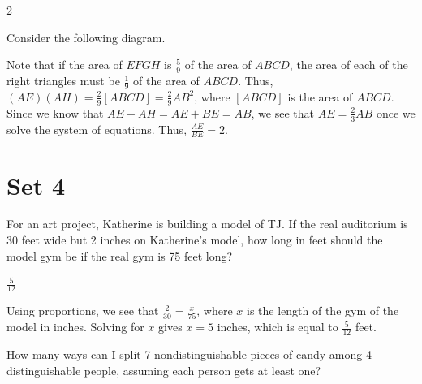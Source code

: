 \documentclass[11pt]{article}
\begin{document}
\begin{answer}
2
\end{answer}

\begin{solution}
Consider the following diagram.
\begin{center}
\end{center}
Note that if the area of $EFGH$ is $\frac{5}{9}$ of the area of $ABCD$, the area of each of the right triangles must be $\frac{1}{9}$ of the area of $ABCD$. Thus, $(AE)(AH) = \frac{2}{9}[ABCD]=\frac{2}{9}AB^2$, where $[ABCD]$ is the area of $ABCD$. Since we know that $AE + AH = AE + BE = AB$, we see that $AE=\frac{2}{3}AB$ once we solve the system of equations. Thus, $\frac{AE}{BE} = \boxed{2}$.
\end{solution}
\newpage
\section*{Set 4}
\begin{problem}
For an art project, Katherine is building a model of TJ. If the real auditorium is 30 feet wide but 2 inches on Katherine's model, how long in feet should the model gym be if the real gym is 75 feet long?
\end{problem}

\begin{answer}
$\frac{5}{12}$
\end{answer}

\begin{solution}
Using proportions, we see that $\frac{2}{30} = \frac{x}{75}$, where $x$ is the length of the gym of the model in inches. Solving for $x$ gives $x=5$ inches, which is equal to $\boxed{\frac{5}{12}}$ feet.
\end{solution}

\begin{problem}
How many ways can I split 7 nondistinguishable pieces of candy among 4 distinguishable people, assuming each person gets at least one?
\end{problem}
\end{document}
